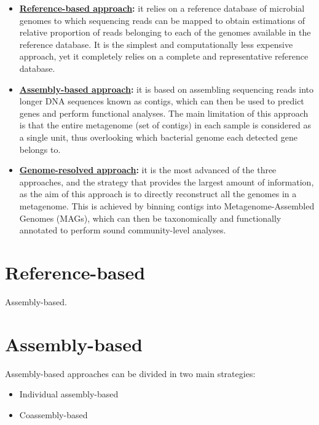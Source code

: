 \documentclass[
]{book}
\providecommand{\tightlist}{%
  \setlength{\itemsep}{0pt}\setlength{\parskip}{0pt}}
\begin{document}
\begin{itemize}
\tightlist
\item
  \textbf{\protect\hyperlink{reference-based}{Reference-based approach}:} it relies on a reference database of microbial genomes to which sequencing reads can be mapped to obtain estimations of relative proportion of reads belonging to each of the genomes available in the reference database. It is the simplest and computationally less expensive approach, yet it completely relies on a complete and representative reference database.
\item
  \textbf{\protect\hyperlink{assembly-based}{Assembly-based approach}:} it is based on assembling sequencing reads into longer DNA sequences known as contigs, which can then be used to predict genes and perform functional analyses. The main limitation of this approach is that the entire metagenome (set of contigs) in each sample is considered as a single unit, thus overlooking which bacterial genome each detected gene belongs to.
\item
  \textbf{\protect\hyperlink{genome-resolved}{Genome-resolved approach}:} it is the most advanced of the three approaches, and the strategy that provides the largest amount of information, as the aim of this approach is to directly reconstruct all the genomes in a metagenome. This is achieved by binning contigs into Metagenome-Assembled Genomes (MAGs), which can then be taxonomically and functionally annotated to perform sound community-level analyses.
\end{itemize}

\hypertarget{reference-based}{%
\section{Reference-based}\label{reference-based}}

Assembly-based.

\hypertarget{assembly-based}{%
\section{Assembly-based}\label{assembly-based}}

Assembly-based approaches can be divided in two main strategies:

\begin{itemize}
\tightlist
\item
  Individual assembly-based
\item
  Coassembly-based
\end{itemize}
\end{document}
